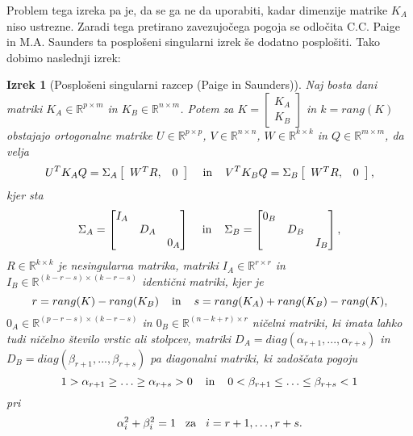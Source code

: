 \documentclass[mat1]{article}
\newtheorem{izrek}{Izrek}
\begin{document}
Problem tega izreka pa je, da se ga ne da uporabiti, kadar dimenzije matrike $K_A$ niso ustrezne. Zaradi tega pretirano zavezujočega pogoja se odločita C.C. Paige in M.A. Saunders ta posplošeni singularni izrek še dodatno posplošiti. Tako dobimo naslednji izrek:
\begin{izrek}[Posplošeni singularni razcep (Paige in Saunders)]
\label{izrek:GSVD} Naj bosta dani matriki $K_A \in \mathbb{R}^{p \times m}$ in $K_B \in \mathbb{R}^{n \times m}$. Potem za $K = \left[\begin{array}{c} K_A \\ K_B \end{array}\right]$ in $k = rang(K)$ obstajajo ortogonalne matrike $U \in \mathbb{R}^{p \times p}$, $V \in \mathbb{R}^{n \times n}$, $W \in \mathbb{R}^{k \times k}$ in $Q \in \mathbb{R}^{m \times m}$, da velja 
\begin{equation} \label{eq4}
U^T K_A Q = \Sigma_A  \left[\begin{array}{cc} W^T R, & 0 \end{array}\right] \hspace{4mm} \text{in} \hspace{4mm} V^T K_B Q = \Sigma_B  \left[\begin{array}{cc} W^T R, & 0 \end{array}\right] \text{,}
\end{equation} kjer sta
$$\Sigma_A = \begin{bmatrix} 
I_A &  & \\
 & D_A & \\
 & & 0_A  
\end{bmatrix} \hspace{4mm} \text{in} \hspace{4mm}
\Sigma_B = \begin{bmatrix} 
0_B &  & \\
 & D_B & \\
 & & I_B  
\end{bmatrix} \text{,}$$ 
$R \in \mathbb{R}^{k \times k}$ je nesingularna matrika, matriki $I_A \in \mathbb{R}^{r \times r}$ in $I_B \in \mathbb{R}^{(k-r-s) \times (k-r-s)}$ identični matriki, kjer je 
$$r = rang(K) - rang(K_B) \hspace{4mm} \text{in} \hspace{4mm} s = rang(K_A) + rang(K_B) - rang(K),$$
$0_A \in \mathbb{R}^{(p-r-s) \times (k-r-s)}$ in $0_B \in \mathbb{R}^{(n-k+r) \times r}$ ničelni matriki, ki imata lahko tudi ničelno število vrstic ali stolpcev, matriki
$D_A = diag(\alpha_{r+1},..., \alpha_{r+s})$ in $D_B = diag(\beta_{r+1},..., \beta_{r+s})$ pa diagonalni matriki, ki zadoščata pogoju
$$1 > \alpha_{r+1} \geq \ldots \geq \alpha_{r+s} > 0 \hspace{4mm} \text{in} \hspace{4mm} 0 < \beta_{r+1} \leq \ldots \leq \beta_{r+s} < 1$$
pri
\begin{equation} \label{alpha+beta-GSVD}
\alpha_i^2 + \beta_i^2 = 1 \hspace{3mm} \text{za} \hspace{3mm} i = r+1,\ldots, r+s
\text{.}
\end{equation}
\end{izrek}
\end{document}
